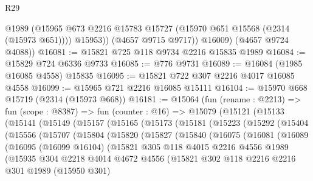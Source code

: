 \begin{lexlean}{R29}
\begin{coremodule}
              @1989
              (@15965 @673 @2216 @15783 @15727 (@15970 @651 @15568 (@2314 (@15973 @651))))
              @15953))
          (@4657 @9715 @9717))
        @16009)
      (@4657 @9724 @4088))
@16081 := @15821 @725 @118 @9734 @2216 @15835 @1989
@16084 := @15829 @724 @6336 @9733
@16085 := @776 @9731
@16089 := @16084 (@1985 @16085 @4558) @15835
@16095 := @15821 @722 @307 @2216 @4017 @16085 @4558
@16099 := @15965 @721 @2216 @16085 @15111
@16104 := @15970 @668 @15719 (@2314 (@15973 @668))
@16181 := @15064
    (fun (rename : @2213) =>
    fun (scope : @8387) =>
    fun (counter : @16) =>
    @15079
      (@15121
        (@15133
          (@15141
            (@15149
              (@15157
                (@15165
                  (@15173
                    (@15181
                      (@15223
                        (@15292
                          (@15404
                            (@15556
                              (@15707
                                (@15804
                                  (@15820
                                    (@15827
                                      (@15840
                                        (@16075
                                          (@16081
                                            (@16089
                                              (@16095
                                                (@16099 @16104)
                                                (@15821
                                                  @305
                                                  @118
                                                  @4015
                                                  @2216
                                                  @4556
                                                  @1989
                                                  (@15935
                                                    @304
                                                    @2218
                                                    @4014
                                                    @4672
                                                    @4556
                                                    (@15821
                                                      @302
                                                      @118
                                                      @2216
                                                      @2216
                                                      @301
                                                      @1989
                                                      (@15950 @301)

\end{coremodule}
\end{lexlean}
